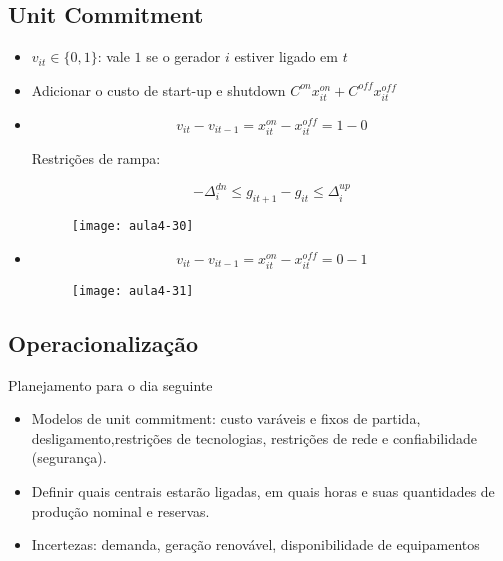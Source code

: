 {\begin{itemize}
\end{itemize}

\subsection{Unit Commitment}
\begin{itemize}
\item $v_{it}\in\{0,1\}$: vale $1$ se o gerador $i$ estiver ligado em $t$
\item Adicionar o custo de start-up e shutdown $C^{on}x_{it}^{on}+C^{off}x_{it}^{off}$
\item \[
v_{it}-v_{it-1}=x_{it}^{on}-x_{it}^{off}=1-0
\]


Restrições de rampa:

\[
-\Delta_{i}^{dn}\leq g_{it+1}-g_{it}\leq\Delta_{i}^{up}
\]
\begin{figure}[H]
\begin{centering}
\texttt{[image: aula4-30]}\protect\caption{\label{fig:aula4-30} }
\end{centering}
\end{figure}

\item \[
v_{it}-v_{it-1}=x_{it}^{on}-x_{it}^{off}=0-1
\]


\begin{figure}[H]
\begin{centering}
\texttt{[image: aula4-31]}\protect\caption{\label{fig:aula4-31} }
\end{centering}
\end{figure}
\end{itemize}
\subsection{Operacionalização}

Planejamento para o dia seguinte

\begin{itemize}
\item Modelos de unit commitment: custo varáveis e fixos de partida, desligamento,restrições de tecnologias, restrições de rede e confiabilidade (segurança).
\item Definir quais centrais estarão ligadas, em quais horas e suas quantidades de produção nominal e reservas.
\item Incertezas: demanda, geração renovável, disponibilidade de equipamentos
\end{itemize}

}
